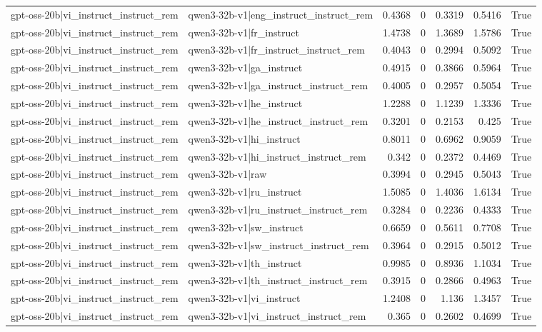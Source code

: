 \begin{table}
\begin{tabular}{l l r r r r l}
gpt-oss-20b|vi_instruct_instruct_rem & qwen3-32b-v1|eng_instruct_instruct_rem & 0.4368 & 0 & 0.3319 & 0.5416 & True \\
gpt-oss-20b|vi_instruct_instruct_rem & qwen3-32b-v1|fr_instruct & 1.4738 & 0 & 1.3689 & 1.5786 & True \\
gpt-oss-20b|vi_instruct_instruct_rem & qwen3-32b-v1|fr_instruct_instruct_rem & 0.4043 & 0 & 0.2994 & 0.5092 & True \\
gpt-oss-20b|vi_instruct_instruct_rem & qwen3-32b-v1|ga_instruct & 0.4915 & 0 & 0.3866 & 0.5964 & True \\
gpt-oss-20b|vi_instruct_instruct_rem & qwen3-32b-v1|ga_instruct_instruct_rem & 0.4005 & 0 & 0.2957 & 0.5054 & True \\
gpt-oss-20b|vi_instruct_instruct_rem & qwen3-32b-v1|he_instruct & 1.2288 & 0 & 1.1239 & 1.3336 & True \\
gpt-oss-20b|vi_instruct_instruct_rem & qwen3-32b-v1|he_instruct_instruct_rem & 0.3201 & 0 & 0.2153 & 0.425 & True \\
gpt-oss-20b|vi_instruct_instruct_rem & qwen3-32b-v1|hi_instruct & 0.8011 & 0 & 0.6962 & 0.9059 & True \\
gpt-oss-20b|vi_instruct_instruct_rem & qwen3-32b-v1|hi_instruct_instruct_rem & 0.342 & 0 & 0.2372 & 0.4469 & True \\
gpt-oss-20b|vi_instruct_instruct_rem & qwen3-32b-v1|raw & 0.3994 & 0 & 0.2945 & 0.5043 & True \\
gpt-oss-20b|vi_instruct_instruct_rem & qwen3-32b-v1|ru_instruct & 1.5085 & 0 & 1.4036 & 1.6134 & True \\
gpt-oss-20b|vi_instruct_instruct_rem & qwen3-32b-v1|ru_instruct_instruct_rem & 0.3284 & 0 & 0.2236 & 0.4333 & True \\
gpt-oss-20b|vi_instruct_instruct_rem & qwen3-32b-v1|sw_instruct & 0.6659 & 0 & 0.5611 & 0.7708 & True \\
gpt-oss-20b|vi_instruct_instruct_rem & qwen3-32b-v1|sw_instruct_instruct_rem & 0.3964 & 0 & 0.2915 & 0.5012 & True \\
gpt-oss-20b|vi_instruct_instruct_rem & qwen3-32b-v1|th_instruct & 0.9985 & 0 & 0.8936 & 1.1034 & True \\
gpt-oss-20b|vi_instruct_instruct_rem & qwen3-32b-v1|th_instruct_instruct_rem & 0.3915 & 0 & 0.2866 & 0.4963 & True \\
gpt-oss-20b|vi_instruct_instruct_rem & qwen3-32b-v1|vi_instruct & 1.2408 & 0 & 1.136 & 1.3457 & True \\
gpt-oss-20b|vi_instruct_instruct_rem & qwen3-32b-v1|vi_instruct_instruct_rem & 0.365 & 0 & 0.2602 & 0.4699 & True \\

\end{tabular}
\end{table}
